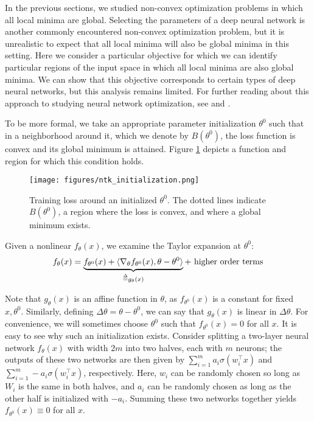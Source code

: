 

 \label{sec:ntk_approach}

In the previous sections, we studied non-convex optimization problems in which all local minima are global. Selecting the parameters of a deep neural network is another commonly encountered non-convex optimization problem, but it is unrealistic to expect that all local minima will also be global minima in this setting. Here we consider a particular objective for which we can identify particular regions of the input space in which all local minima are also global minima. We can show that this objective corresponds to certain types of deep neural networks, but this analysis remains limited. For further reading about this approach to studying neural network optimization, see \cite{liang2018adding} and \cite{du2019width}.


To be more formal, we take an appropriate parameter initialization $\theta^0$ such that in a neighborhood around it, which we denote by $B(\theta^0)$, the loss function is convex and its global minimum is attained. Figure \ref{lec13:fig:NTKapproach} depicts a function and region for which this condition holds. 

\begin{figure}[ht]
    \centering
    \texttt{[image: figures/ntk\_initialization.png]}
    \caption{Training loss around an initialized $\theta^0$. The dotted lines indicate $B(\theta^0)$, a region where the loss is convex, and where a global minimum exists.}
    \label{lec13:fig:NTKapproach}
\end{figure}


Given a nonlinear $f_\theta(x)$, we examine the Taylor expansion at $\theta^0$: 
\begin{align} 
    f_\theta(x) = \underbrace{f_{\theta^0}(x) + \langle \nabla_\theta f_{\theta^0}(x),\theta-\theta^0 \rangle}_{\defeq g_\theta(x)} + \text{ higher order terms}
\end{align} 

Note that $g_\theta(x)$ is an affine function in $\theta$, as $f_{\theta^0}(x)$ is a constant for fixed $x,\theta^0$. Similarly, defining $\Delta \theta = \theta-\theta^0$, we can say that $g_\theta(x)$ is linear in $\Delta \theta$. For convenience, we will sometimes choose $\theta^0$ such that $f_{\theta^0}(x) = 0$ for all $x$. It is easy to see why such an initialization exists. Consider splitting a two-layer neural network $f_{\theta}(x)$ with width $2m$ into two halves, each with $m$ neurons; the outputs of these two networks are then given by $\sum_{i=1}^m a_i \sigma (w_i^\top x)$ and $\sum_{i=1}^m -a_i \sigma (w_i^\top x)$, respectively. Here, $w_i$ can be randomly chosen so long as $W_i$ is the same in both halves, and $a_i$ can be randomly chosen as long as the other half is initialized with $-a_i$. Summing these two networks together yields $f_{\theta^0}(x) \equiv 0$ for all $x$.

